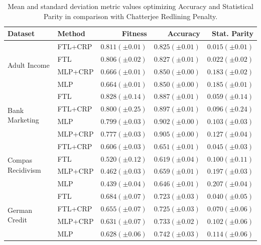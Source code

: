  \begin{table}
    \centering
    \caption{Mean and standard deviation metric values optimizing Accuracy and Statistical Parity in comparison with Chatterjee Redlining Penalty.}\label{tab:complete_acc_parity_crp}
   {\footnotesize \begin{tabular}{llrrr}
    \toprule
    Dataset & Method & Fitness & Accuracy & Stat. Parity \\
    \midrule

    \multirow[t]{4}{*}{Adult Income} & FTL+CRP & $0.811 (\pm0.01)$ & $0.825 (\pm0.01)$ & $0.015 (\pm0.01)$ \\
     & FTL & $0.806 (\pm0.02)$ & $0.827 (\pm0.01)$ & $0.022 (\pm0.02)$ \\
     & MLP+CRP & $0.666 (\pm0.01)$ & $0.850 (\pm0.00)$ & $0.183 (\pm0.02)$ \\
     & MLP & $0.664 (\pm0.01)$ & $0.850 (\pm0.00)$ & $0.185 (\pm0.01)$ \\
    \midrule
    \multirow[t]{4}{*}{Bank Marketing} & FTL & $0.828 (\pm0.14)$ & $0.887 (\pm0.01)$ & $0.059 (\pm0.14)$ \\
     & FTL+CRP & $0.800 (\pm0.25)$ & $0.897 (\pm0.01)$ & $0.096 (\pm0.24)$ \\
     & MLP & $0.799 (\pm0.03)$ & $0.902 (\pm0.00)$ & $0.103 (\pm0.03)$ \\
     & MLP+CRP & $0.777 (\pm0.03)$ & $0.905 (\pm0.00)$ & $0.127 (\pm0.04)$ \\
    \midrule
    \multirow[t]{4}{*}{Compas Recidivism} & FTL+CRP & $0.606 (\pm0.03)$ & $0.651 (\pm0.01)$ & $0.045 (\pm0.03)$ \\
     & FTL & $0.520 (\pm0.12)$ & $0.619 (\pm0.04)$ & $0.100 (\pm0.11)$ \\
     & MLP+CRP & $0.462 (\pm0.03)$ & $0.659 (\pm0.01)$ & $0.197 (\pm0.03)$ \\
     & MLP & $0.439 (\pm0.04)$ & $0.646 (\pm0.01)$ & $0.207 (\pm0.04)$ \\
    \midrule
    \multirow[t]{4}{*}{German Credit} & FTL & $0.684 (\pm0.07)$ & $0.723 (\pm0.03)$ & $0.040 (\pm0.05)$ \\
     & FTL+CRP & $0.655 (\pm0.07)$ & $0.725 (\pm0.03)$ & $0.070 (\pm0.06)$ \\
     & MLP+CRP & $0.631 (\pm0.07)$ & $0.733 (\pm0.02)$ & $0.102 (\pm0.06)$ \\
     & MLP & $0.628 (\pm0.06)$ & $0.742 (\pm0.03)$ & $0.114 (\pm0.06)$ \\
     \bottomrule
\end{tabular}}
\end{table}


